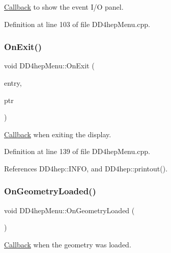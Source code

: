 \hyperlink{class_d_d4hep_1_1_callback}{Callback} to show the event I/O panel. 



Definition at line 103 of file D\+D4hep\+Menu.\+cpp.

\hypertarget{class_d_d4hep_1_1_d_d4hep_menu_a62954b16db94eb57f3c88600042f1a3e}{}\label{class_d_d4hep_1_1_d_d4hep_menu_a62954b16db94eb57f3c88600042f1a3e} 
\subsubsection{\texorpdfstring{On\+Exit()}{OnExit()}}
{\footnotesize\ttfamily void D\+D4hep\+Menu\+::\+On\+Exit (\begin{DoxyParamCaption}\item[{T\+G\+Menu\+Entry $\ast$}]{entry,  }\item[{void $\ast$}]{ptr }\end{DoxyParamCaption})}



\hyperlink{class_d_d4hep_1_1_callback}{Callback} when exiting the display. 



Definition at line 139 of file D\+D4hep\+Menu.\+cpp.



References D\+D4hep\+::\+I\+N\+FO, and D\+D4hep\+::printout().

\hypertarget{class_d_d4hep_1_1_d_d4hep_menu_a4cc12c7e0047c638119e0807f860fbc1}{}\label{class_d_d4hep_1_1_d_d4hep_menu_a4cc12c7e0047c638119e0807f860fbc1} 
\subsubsection{\texorpdfstring{On\+Geometry\+Loaded()}{OnGeometryLoaded()}}
{\footnotesize\ttfamily void D\+D4hep\+Menu\+::\+On\+Geometry\+Loaded (\begin{DoxyParamCaption}{ }\end{DoxyParamCaption})}



\hyperlink{class_d_d4hep_1_1_callback}{Callback} when the geometry was loaded. 




